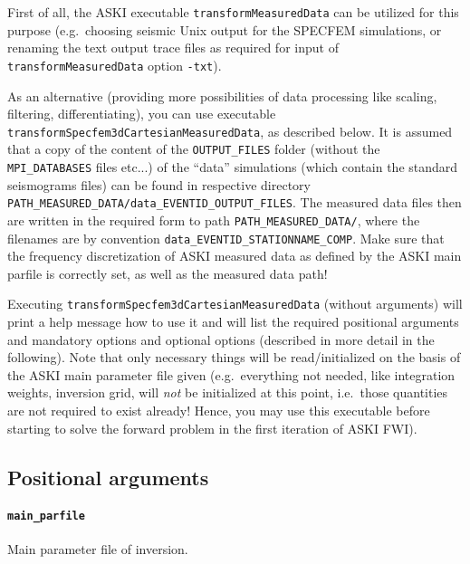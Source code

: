 \documentclass[12pt,a4paper]{article}
\newcommand{\lcode}[1]{\nolinkurl{#1}}
\newcommand{\ASKI}{ {\ttfamily ASKI} }
\begin{document}
First of all, the \ASKI{} executable \lcode{transformMeasuredData} can be utilized
for this purpose (e.g.\ choosing seismic Unix output for the SPECFEM simulations, or renaming the text output 
trace files as required for input of \lcode{transformMeasuredData} option \lcode{-txt}).

As an alternative (providing more possibilities of data processing like scaling, filtering, differentiating),
you can use executable \lcode{transformSpecfem3dCartesianMeasuredData}, as described below.
It is assumed that a copy of the content of the \lcode{OUTPUT_FILES} folder 
(without the \lcode{MPI_DATABASES} files etc...)
of the ``data'' simulations (which contain the standard seismograms files) can be found in respective
directory \lcode{PATH_MEASURED_DATA/data_EVENTID_OUTPUT_FILES}. 
The measured data files then are written in the required form to path \lcode{PATH_MEASURED_DATA/}, where the filenames 
are by convention \lcode{data_EVENTID_STATIONNAME_COMP}. 
Make sure that the frequency discretization of \ASKI{} measured data as defined by the \ASKI{} main parfile 
is correctly set, as well as the measured data path!

Executing \lcode{transformSpecfem3dCartesianMeasuredData} (without arguments) 
will print a help message how to use it and will list the required positional 
arguments and mandatory options and optional options (described in more detail in the following). 
Note that only necessary things
will be read/initialized on the basis of the \ASKI{} main parameter file given (e.g.\ everything not needed, 
like integration weights, inversion grid, will \emph{not} be initialized at this point, i.e.\ those
quantities are not required to exist already! Hence, you may use this executable before starting to solve
the forward problem in the first iteration of \ASKI{} FWI).

\subsection*{Positional arguments}
\paragraph{\lcode{main_parfile}}
Main parameter file of inversion.

\end{document}
